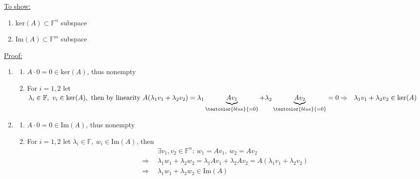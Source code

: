 {\color{solution}

	\underline{To show:}
	\begin{enumerate}
		\item $\text{ker}(A)\subset\mathbb{F}^n$ subspace
		\item $\text{Im}(A)\subset\mathbb{F}^m$ subspace
	\end{enumerate}
	\underline{Proof:}
	\begin{enumerate}
		\item \begin{enumerate}
			\item $A\cdot0=0\in\text{ker}(A)$, thus nonempty
			\item For $i=1,2$ let $\lambda_i\in\mathbb{F},~v_i\in\text{ker}(A),~\text{then by linearity}~
			A(\lambda_1v_1+ \lambda_2v_2)
			=\lambda_1\underbrace{Av_1}_{\textcolor{blue}{=0}}+\lambda_2\underbrace{Av_2}_{\textcolor{blue}{=0}}=0\\
			\Rightarrow~~\lambda_1v_1+ \lambda_2v_2\in\text{ker}(A)$
		\end{enumerate}
		\item \begin{enumerate}
			\item $A\cdot0=0\in\text{Im}(A)$, thus nonempty
			\item For $i=1,2$ let $\lambda_i\in\mathbb{F},~w_i\in\text{Im}(A)$, then
			\begin{align*}
			~~&\exists v_1,v_2\in \mathbb{F}^n:~w_1=Av_1,~w_2=Av_2\\
			\Rightarrow~~&\lambda_1 w_1+ \lambda_2 w_2=\lambda_1 Av_1+\lambda_2Av_2=A(\lambda_1 v_1+\lambda_2 v_2)\\
			\Rightarrow~~&\lambda_1 w_1+ \lambda_2w_2\in\text{Im}(A)
			\end{align*}
		\end{enumerate}
\end{enumerate}
}